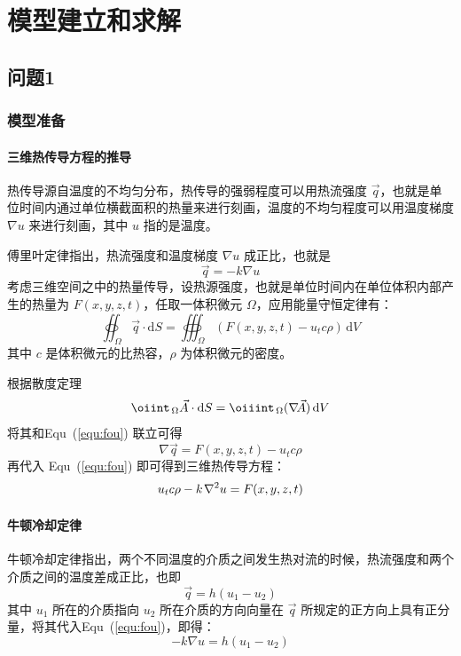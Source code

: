 \documentclass[../main.tex]{subfiles}
\begin{document}
\section{模型建立和求解}
\subsection{问题1}
\subsubsection{模型准备}
\paragraph{三维热传导方程的推导}
热传导源自温度的不均匀分布，热传导的强弱程度可以用热流强度 \(\vec{q}\)，也就是单位时间内通过单位横截面积的热量来进行刻画，温度的不均匀程度可以用温度梯度 \(\nabla u\) 来进行刻画，其中 \(u\) 指的是温度。

傅里叶定律指出，热流强度和温度梯度 \(\nabla u\) 成正比，也就是
\begin{equation}\label{equ:fou}
\vec q = - k \nabla u
\end{equation}
考虑三维空间之中的热量传导，设热源强度，也就是单位时间内在单位体积内部产生的热量为 \(F (x,  y , z, t)\)，任取一体积微元 \(\Omega\)，应用能量守恒定律有：
\begin{equation}
\oiint _{\, \Omega} \vec q \cdot \mathrm{d} S = \oiiint _{\, \Omega} ( F (x , y , z,t) - u _{t} c \rho ) \, \mathrm{d} V
\end{equation}
其中 \(c\) 是体积微元的比热容，\(\rho\) 为体积微元的密度。

根据散度定理
\begin{equation}
\oiint _{\,\Omega} \vec A  \cdot \mathrm{d} S = \oiiint _{\,\Omega} ( \nabla\kern -1.8pt\vec A) \, \mathrm{d}V
\end{equation}
将其和Equ~(\ref{equ:fou}) 联立可得
\begin{equation}
\nabla \vec q = F (x , y , z ,t) - u_{t} c \rho
\end{equation}
再代入 Equ~(\ref{equ:fou}) 即可得到三维热传导方程：
\begin{equation}\label{equ:cond}
u_{t} c \rho - k\kern 1pt \nabla^{2} u = F (x , y , z, t)
\end{equation}

\paragraph{牛顿冷却定律}
牛顿冷却定律指出，两个不同温度的介质之间发生热对流的时候，热流强度和两个介质之间的温度差成正比，也即
\begin{equation}
\vec q = h (u_1 - u_2)
\end{equation}
其中 \(u_1\) 所在的介质指向 \(u_2\) 所在介质的方向向量在 \(\vec q\) 所规定的正方向上具有正分量，将其代入Equ~(\ref{equ:fou})，即得：
\begin{equation}\label{equ:len}
{-k} \nabla u = h ( u_1 - u_2)
\end{equation}
\end{document}
